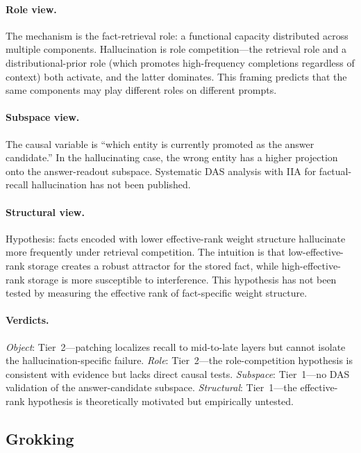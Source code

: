 \documentclass{article}
\begin{document}
\paragraph{Role view.}
The mechanism is the fact-retrieval role: a functional capacity
distributed across multiple components. Hallucination is role
competition---the retrieval role and a distributional-prior role (which
promotes high-frequency completions regardless of context) both activate,
and the latter dominates. This framing predicts that the same components
may play different roles on different prompts.

\paragraph{Subspace view.}
The causal variable is ``which entity is currently promoted as the answer
candidate.'' In the hallucinating case, the wrong entity has a higher
projection onto the answer-readout subspace. Systematic DAS analysis with
IIA for factual-recall hallucination has not been published.

\paragraph{Structural view.}
Hypothesis: facts encoded with lower effective-rank weight structure
hallucinate more frequently under retrieval competition. The intuition
is that low-effective-rank storage creates a robust attractor for the
stored fact, while high-effective-rank storage is more susceptible to
interference. This hypothesis has not been tested by measuring the
effective rank of fact-specific weight structure.

\paragraph{Verdicts.}
\emph{Object}: Tier~2---patching localizes recall to mid-to-late layers
but cannot isolate the hallucination-specific failure.
\emph{Role}: Tier~2---the role-competition hypothesis is consistent with
evidence but lacks direct causal tests.
\emph{Subspace}: Tier~1---no DAS validation of the answer-candidate
subspace.
\emph{Structural}: Tier~1---the effective-rank hypothesis is
theoretically motivated but empirically untested.


\subsection{Grokking}\label{app:cs_grokking}
\end{document}
